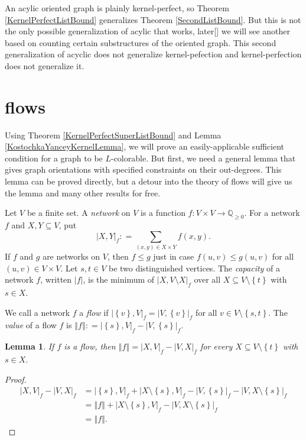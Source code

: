 \documentclass{amsbook}
\newcommand{\aaside}[2]{\marginnote{\scriptsize{#1}}[#2]}
\theoremstyle{plain}
\newtheorem{lemma}{Lemma}
\numberwithin{equation}{chapter}
\newcommand{\set}[1]{\left\{ #1 \right\}}
\newcommand{\card}[1]{\left|#1\right|}
\newcommand{\size}[1]{\left\Vert#1\right\Vert}
\newcommand{\func}[3]{#1\colon #2 \rightarrow #3}
\newcommand{\DefinedAs}{\mathrel{\mathop:}=}
\newcommand{\Q}{\mathbb{Q}}
\begin{document}
An acylic oriented graph is plainly kernel-perfect, so Theorem \ref{KernelPerfectListBound} generalizes Theorem \ref{SecondListBound}.  
But this is not the only possible generalization of acylic that works, later\aaside{\textcolor{blue}{what chapter?}}{} we will see another based on counting certain substructures of the oriented graph. 
This second generalization of acyclic does not generalize kernel-pefection and kernel-perfection does not generalize it.

\section*{flows}
Using Theorem \ref{KernelPerfectSuperListBound} and Lemma \ref{KostochkaYanceyKernelLemma}, we will prove an easily-applicable sufficient condition for a graph to be $L$-colorable.  
But first, we need a general lemma that gives graph orientations with specified constraints on their out-degrees.  This lemma can be proved directly, 
but a detour into the theory of flows will give us the lemma and many other results for free.

Let $V$ be a finite set.  A \emph{network} on $V$ is a function $\func{f}{V\times V}{\Q_{\ge 0}}$.  For a network $f$ and $X,Y \subseteq V$, put
\[\card{X,Y}_f \DefinedAs \sum_{(x,y) \in X\times Y} f(x,y).\]
If $f$ and $g$ are networks on $V$, then $f \le g$ just in case $f(u,v) \le g(u,v)$ for all $(u,v)\in V\times V$.
Let $s,t \in V$ be two distinguished vertices.  The \emph{capacity} of a network $f$, written $\card{f}$, is the minimum of $\card{X, V\setminus X}_f$ over all $X \subseteq V\setminus\set{t}$ with $s \in X$.

We call a network $f$ a \emph{flow} if $\card{\set{v},V}_f = \card{V,\set{v}}_f$ for all $v \in V \setminus \set{s,t}$.
The \emph{value} of a flow $f$ is $\size{f} \DefinedAs \card{\set{s},V}_f - \card{V,\set{s}}_f$.

\begin{lemma}\label{FlowValues}
If $f$ is a flow, then $\size{f} = \card{X, V}_f - \card{V, X}_f$ for every $X \subseteq V\setminus\set{t}$ with $s \in X$.
\end{lemma}
\begin{proof}
\begin{align*}
\card{X, V}_f - \card{V, X}_f &= \card{\set{s}, V}_f + \card{X\setminus\set{s}, V}_f - \card{V, \set{s}}_f - \card{V, X\setminus\set{s}}_f\\
&= \size{f} + \card{X\setminus\set{s}, V}_f - \card{V, X\setminus\set{s}}_f\\
&= \size{f}.
\end{align*}
\end{proof}
\end{document}
